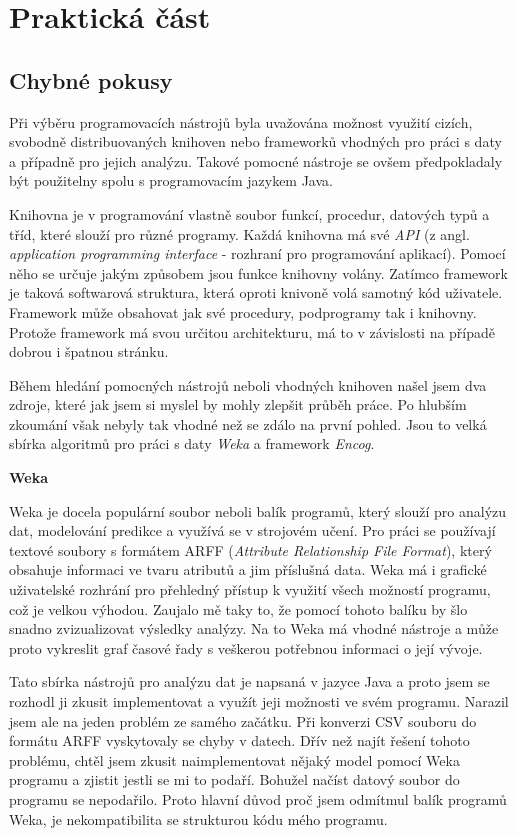 \documentclass[a4paper,12pt,twoside]{scrreprt}
\begin{document}
\chapter{Praktická část}
\section{Chybné pokusy}
\vspace{0.5cm}
Při výběru programovacích nástrojů byla uvažována možnost využití cizích, svobodně distribuovaných knihoven nebo frameworků vhodných pro práci s daty a případně pro jejich analýzu. Takové pomocné nástroje se ovšem předpokladaly být použitelny spolu s programovacím jazykem Java. 

Knihovna je v programování vlastně soubor funkcí, procedur, datových typů a tříd, které slouží pro různé programy. Každá knihovna má své \textit{API} (z angl. \textit{application programming interface} - rozhraní pro programování aplikací). Pomocí něho se určuje jakým způsobem jsou funkce knihovny volány. Zatímco framework je taková softwarová struktura, která oproti knivoně volá samotný kód uživatele. Framework může obsahovat jak své procedury, podprogramy tak i knihovny. Protože framework má svou určitou architekturu, má to v závislosti na případě dobrou i špatnou stránku.      

Během hledání pomocných nástrojů neboli vhodných knihoven našel jsem dva zdroje, které jak jsem si myslel by mohly zlepšit průběh práce. Po hlubším zkoumání však nebyly tak vhodné než se zdálo na první pohled. Jsou to velká sbírka algoritmů pro práci s daty \textit{Weka} a framework \textit{Encog}.  
\vspace*{0.5cm}

\textbf{Weka}

Weka je docela populární soubor neboli balík programů, který slouží pro analýzu dat, modelování predikce a využívá se v strojovém učení. Pro práci se používají textové soubory s formátem ARFF (\textit{Attribute Relationship File Format}), který obsahuje informaci ve tvaru atributů a jim příslušná data. Weka má i grafické uživatelské rozhrání pro přehledný přístup k využití všech možností programu, což je velkou výhodou. Zaujalo mě taky to, že pomocí tohoto balíku by šlo snadno zvizualizovat výsledky analýzy. Na to Weka má vhodné nástroje a může proto vykreslit graf časové řady s veškerou potřebnou informaci o její vývoje. 

Tato sbírka nástrojů pro analýzu dat je napsaná v jazyce Java a proto jsem se rozhodl ji zkusit implementovat a využít jeji možnosti ve svém programu. Narazil jsem ale na jeden problém ze samého začátku. Při konverzi CSV souboru do formátu ARFF vyskytovaly se chyby v datech. Dřív než najít řešení tohoto problému, chtěl jsem zkusit naimplementovat nějaký model pomocí Weka programu a zjistit jestli se mi to podaří. Bohužel načíst datový soubor do programu se nepodařilo. Proto hlavní důvod proč jsem odmítmul balík programů Weka, je nekompatibilita se strukturou kódu mého programu.            
\end{document}
